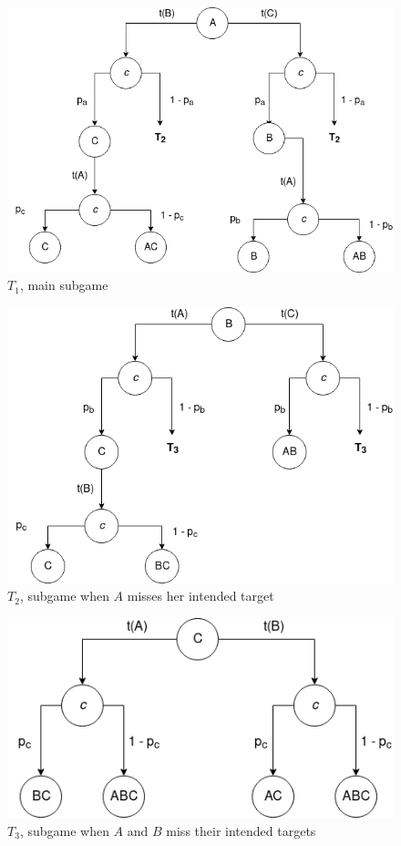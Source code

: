 \documentclass[letterpaper]{article}
\begin{document}
\begin{figure}[h!]
 \centerline{\includegraphics[scale=0.5]{images/T1}}
 \caption{$T_1$, main subgame}
 \label{fig:t1}
\end{figure}

\begin{figure}[h!]
 \centerline{\includegraphics[scale=0.5]{images/T2}}
 \caption{$T_2$, subgame when $A$ misses her intended target}
 \label{fig:t2}
\end{figure}

\begin{figure}[h!]
 \centerline{\includegraphics[scale=0.5]{images/T3}}
 \caption{$T_3$, subgame when $A$ and $B$ miss their intended targets}
 \label{fig:t3}
\end{figure}
\end{document}
